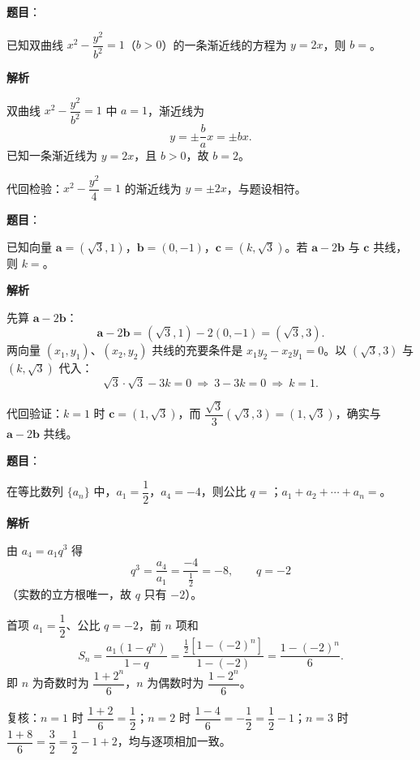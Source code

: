 \begin{answer}

\textbf{题目}：

已知双曲线 $x^2-\dfrac{y^2}{b^2}=1$（$b>0$）的一条渐近线的方程为 $y=2x$，则 $b=$\gkblank{}。

\textbf{解析}

双曲线 $x^2-\dfrac{y^2}{b^2}=1$ 中 $a=1$，渐近线为
\nopagebreak[4]
\[
y=\pm\frac ba x=\pm bx.
\]
已知一条渐近线为 $y=2x$，且 $b>0$，故 $b=2$。

代回检验：$x^2-\dfrac{y^2}{4}=1$ 的渐近线为 $y=\pm2x$，与题设相符。


\end{answer}
\begin{answer}

\textbf{题目}：

已知向量 $\boldsymbol a=(\sqrt3,1)$，$\boldsymbol b=(0,-1)$，$\boldsymbol c=(k,\sqrt3)$。若 $\boldsymbol a-2\boldsymbol b$ 与 $\boldsymbol c$ 共线，则 $k=$\gkblank{}。

\textbf{解析}

先算 $\boldsymbol a-2\boldsymbol b$：
\nopagebreak[4]
\[
\boldsymbol a-2\boldsymbol b=(\sqrt3,1)-2(0,-1)=(\sqrt3,3).
\]
两向量 $(x_1,y_1)$、$(x_2,y_2)$ 共线的充要条件是 $x_1y_2-x_2y_1=0$。以 $(\sqrt3,3)$ 与 $(k,\sqrt3)$ 代入：
\nopagebreak[4]
\[
\sqrt3\cdot\sqrt3-3k=0\ \Longrightarrow\ 3-3k=0\ \Longrightarrow\ k=1.
\]

代回验证：$k=1$ 时 $\boldsymbol c=(1,\sqrt3)$，而 $\dfrac{\sqrt3}{3}(\sqrt3,3)=(1,\sqrt3)$，确实与 $\boldsymbol a-2\boldsymbol b$ 共线。


\end{answer}
\begin{answer}

\textbf{题目}：

在等比数列 $\{a_n\}$ 中，$a_1=\dfrac12$，$a_4=-4$，则公比 $q=$\gkblank{}；$a_1+a_2+\cdots+a_n=$\gkblank{}。

\textbf{解析}

由 $a_4=a_1q^3$ 得
\nopagebreak[4]
\[
q^3=\frac{a_4}{a_1}=\frac{-4}{\frac12}=-8,\qquad q=-2
\]
（实数的立方根唯一，故 $q$ 只有 $-2$）。

首项 $a_1=\dfrac12$、公比 $q=-2$，前 $n$ 项和
\nopagebreak[4]
\[
S_n=\frac{a_1(1-q^n)}{1-q}
=\frac{\frac12\left[1-(-2)^n\right]}{1-(-2)}
=\frac{1-(-2)^n}{6}.
\]
即 $n$ 为奇数时为 $\dfrac{1+2^n}{6}$，$n$ 为偶数时为 $\dfrac{1-2^n}{6}$。

复核：$n=1$ 时 $\dfrac{1+2}{6}=\dfrac12$；$n=2$ 时 $\dfrac{1-4}{6}=-\dfrac12=\dfrac12-1$；$n=3$ 时 $\dfrac{1+8}{6}=\dfrac32=\dfrac12-1+2$，均与逐项相加一致。


\end{answer}
